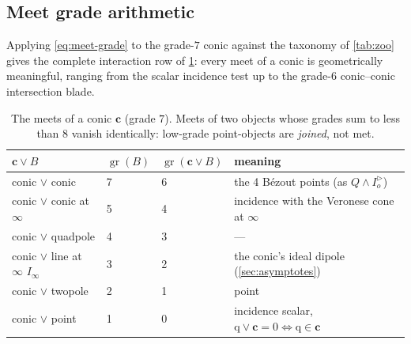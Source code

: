 \documentclass{birkjour}
\theoremstyle{definition}
\theoremstyle{remark}
\newcommand{\Iod}{I_o^{\triangleright}}      %
\newcommand{\Iinf}{I_\infty}
\newcommand{\meet}{\vee}
\newcommand{\joinp}{\wedge}
\begin{document}
\subsection{Meet grade arithmetic}
\label{sec:meet-arithmetic}
Applying \cref{eq:meet-grade} to the grade-$7$ conic against the taxonomy of
\cref{tab:zoo} gives the complete interaction row of \cref{tab:conic-meets}:
every meet of a conic is geometrically meaningful, ranging from the scalar
incidence test up to the grade-$6$ conic--conic intersection blade.

\begin{table}[H]
\centering
\caption{The meets of a conic $\mathbf{c}$ (grade $7$). Meets of two objects
whose grades sum to less than $8$ vanish identically: low-grade point-objects
are \emph{joined}, not met.}
\label{tab:conic-meets}
\small
\begin{tabular}{@{}llll@{}}
\toprule
$\mathbf{c}\meet B$ & $\operatorname{gr}(B)$ & $\operatorname{gr}(\mathbf{c}\meet B)$ & meaning \\
\midrule
conic $\meet$ conic            & 7 & 6 & the 4 B\'ezout points (as $Q\joinp\Iod$) \\
conic $\meet$ conic at $\infty$& 5 & 4 & incidence with the Veronese cone at $\infty$ \\
conic $\meet$ quadpole         & 4 & 3 & --- \\
conic $\meet$ line at $\infty$ $\Iinf$ & 3 & 2 & the conic's ideal dipole (\cref{sec:asymptotes}) \\
conic $\meet$ twopole          & 2 & 1 & point \\
conic $\meet$ point            & 1 & 0 & incidence scalar, $\mathrm{q}\meet\mathbf{c}=0 \iff \mathrm{q}\in\mathbf{c}$ \\
\bottomrule
\end{tabular}
\end{table}
\end{document}
